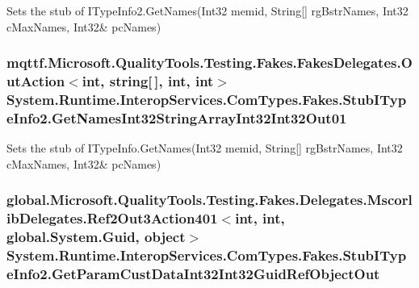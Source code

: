 Sets the stub of I\-Type\-Info2.\-Get\-Names(Int32 memid, String\mbox{[}\mbox{]} rg\-Bstr\-Names, Int32 c\-Max\-Names, Int32\& pc\-Names)

\hypertarget{class_system_1_1_runtime_1_1_interop_services_1_1_com_types_1_1_fakes_1_1_stub_i_type_info2_a4d9a62f51763cea13d43cd07e0843809}{
\subsubsection[{Get\-Names\-Int32\-String\-Array\-Int32\-Int32\-Out01}]{\setlength{\rightskip}{0pt plus 5cm}mqttf.\-Microsoft.\-Quality\-Tools.\-Testing.\-Fakes.\-Fakes\-Delegates.\-Out\-Action$<$int, string\mbox{[}$\,$\mbox{]}, int, int$>$ System.\-Runtime.\-Interop\-Services.\-Com\-Types.\-Fakes.\-Stub\-I\-Type\-Info2.\-Get\-Names\-Int32\-String\-Array\-Int32\-Int32\-Out01}}\label{class_system_1_1_runtime_1_1_interop_services_1_1_com_types_1_1_fakes_1_1_stub_i_type_info2_a4d9a62f51763cea13d43cd07e0843809}


Sets the stub of I\-Type\-Info.\-Get\-Names(Int32 memid, String\mbox{[}\mbox{]} rg\-Bstr\-Names, Int32 c\-Max\-Names, Int32\& pc\-Names)

\hypertarget{class_system_1_1_runtime_1_1_interop_services_1_1_com_types_1_1_fakes_1_1_stub_i_type_info2_a98055cc10076e5e24c837194b0f411d2}{
\subsubsection[{Get\-Param\-Cust\-Data\-Int32\-Int32\-Guid\-Ref\-Object\-Out}]{\setlength{\rightskip}{0pt plus 5cm}global.\-Microsoft.\-Quality\-Tools.\-Testing.\-Fakes.\-Delegates.\-Mscorlib\-Delegates.\-Ref2\-Out3\-Action401$<$int, int, global.\-System.\-Guid, object$>$ System.\-Runtime.\-Interop\-Services.\-Com\-Types.\-Fakes.\-Stub\-I\-Type\-Info2.\-Get\-Param\-Cust\-Data\-Int32\-Int32\-Guid\-Ref\-Object\-Out}}\label{class_system_1_1_runtime_1_1_interop_services_1_1_com_types_1_1_fakes_1_1_stub_i_type_info2_a98055cc10076e5e24c837194b0f411d2}


